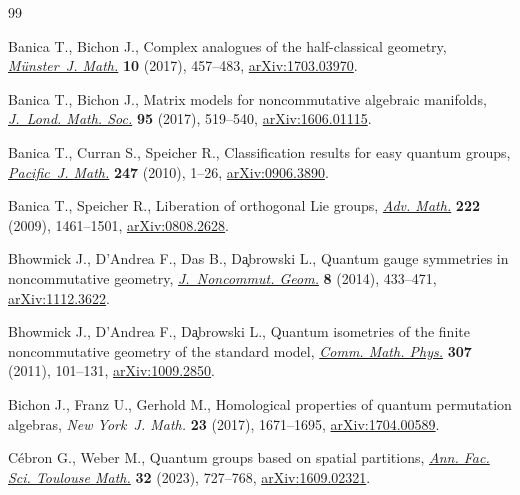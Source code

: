 \begin{thebibliography}{99}
\footnotesize\itemsep=0pt

Banica T., Bichon J., Complex analogues of the half-classical geometry,
  \href{https://doi.org/10.17879/70299518811}{\textit{M\"unster~J. Math.}} \textbf{10} (2017), 457--483,
  \href{https://arxiv.org/abs/1703.03970}{arXiv:1703.03970}.

Banica T., Bichon J., Matrix models for noncommutative algebraic manifolds,
  \href{https://doi.org/10.1112/jlms.12020}{\textit{J.~Lond. Math. Soc.}} \textbf{95} (2017), 519--540,
  \href{https://arxiv.org/abs/1606.01115}{arXiv:1606.01115}.

Banica T., Curran S., Speicher R., Classification results for easy quantum
  groups, \href{https://doi.org/10.2140/pjm.2010.247.1}{\textit{Pacific~J. Math.}} \textbf{247} (2010), 1--26,
  \href{https://arxiv.org/abs/0906.3890}{arXiv:0906.3890}.

Banica T., Speicher R., Liberation of orthogonal {L}ie groups, \href{https://doi.org/10.1016/j.aim.2009.06.009}{\textit{Adv.
  Math.}} \textbf{222} (2009), 1461--1501, \href{https://arxiv.org/abs/0808.2628}{arXiv:0808.2628}.

Bhowmick J., D'Andrea F., Das B., D\c{a}browski L., Quantum gauge symmetries in
  noncommutative geometry, \href{https://doi.org/10.4171/JNCG/161}{\textit{J.~Noncommut. Geom.}} \textbf{8} (2014),
  433--471, \href{https://arxiv.org/abs/1112.3622}{arXiv:1112.3622}.

Bhowmick J., D'Andrea F., D\c{a}browski L., Quantum isometries of the finite
  noncommutative geometry of the standard model, \href{https://doi.org/10.1007/s00220-011-1301-2}{\textit{Comm. Math. Phys.}}
  \textbf{307} (2011), 101--131, \href{https://arxiv.org/abs/1009.2850}{arXiv:1009.2850}.

Bichon J., Franz U., Gerhold M., Homological properties of quantum permutation
  algebras, \textit{New York~J. Math.} \textbf{23} (2017), 1671--1695,
  \href{https://arxiv.org/abs/1704.00589}{arXiv:1704.00589}.

C\'ebron G., Weber M., Quantum groups based on spatial partitions, \href{https://doi.org/10.5802/afst.1750}{\textit{Ann.
  Fac. Sci. Toulouse Math.}} \textbf{32} (2023), 727--768, \href{https://arxiv.org/abs/1609.02321}{arXiv:1609.02321}.


\end{thebibliography}
